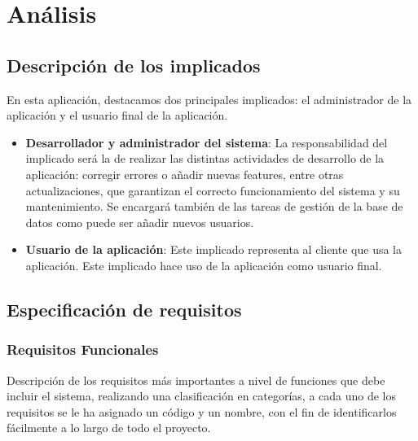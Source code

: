 
\chapter{Análisis}


\section{Descripción de los implicados} \label{implicados}

En esta aplicación, destacamos dos principales implicados: el administrador de la aplicación y el usuario final de la aplicación.

\begin{itemize}
	\item \textbf{Desarrollador y administrador del sistema}: La responsabilidad del implicado será la de realizar las distintas actividades de desarrollo de la aplicación: corregir errores o añadir nuevas features, entre otras actualizaciones, que garantizan el correcto funcionamiento del sistema y su mantenimiento. Se encargará también de las tareas de gestión de la base de datos como puede ser añadir nuevos usuarios.
	
	\item \textbf{Usuario de la aplicación}: Este implicado representa al cliente que usa la aplicación. Este implicado hace uso de la aplicación como usuario final.
\end{itemize}

\section{Especificación de requisitos}

\subsection{Requisitos Funcionales}

Descripción de los requisitos más importantes a nivel de funciones que debe incluir el sistema, realizando una clasificación en categorías, a cada uno de los requisitos se le ha asignado un código y un nombre, con el fin de identificarlos fácilmente a lo largo de todo el proyecto. 

